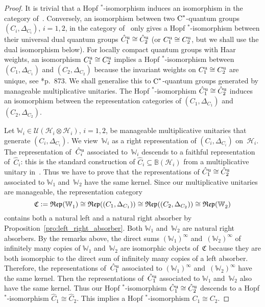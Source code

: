 \documentclass[a4paper]{amsart}
\numberwithin{equation}{section}
\theoremstyle{plain}
\numberwithin{theorem}{section}
\theoremstyle{definition}
\theoremstyle{remark}
\newcommand*{\Cat}{\mathfrak C}     %
\newcommand*{\Corepcat}[1]{\mathfrak{Rep}(#1)}%
\newcommand*{\nb}{\nobreakdash}
\newcommand*{\Star}{$^*$\nb-}
\newcommand*{\Comult}[1][]{\Delta_{#1}}%
\newcommand*{\Bound}{\mathbb B}%
\newcommand*{\univ}{\textup u}%
\newcommand*{\Multunit}[1][]{\mathbb W^{#1}}%
\newcommand*{\Cst}{\textup C^*}%
\newcommand*{\Hils}[1][H]{\mathcal{#1}}%
\newcommand*{\U}{\mathcal U}%
\newcommand*{\defeq}{\mathrel{\vcentcolon=}}
\begin{document}
\begin{proof}
  It is trivial that a Hopf \Star{}isomorphism induces an isomorphism
  in the category of~\cite{Meyer-Roy-Woronowicz:Homomorphisms}.
  Conversely, an isomorphism between two \(\Cst\)\nb-quantum
  groups \((C_i,\Comult[C_i])\),
  \(i=1,2\),
  in the category of~\cite{Meyer-Roy-Woronowicz:Homomorphisms} only
  gives a Hopf \Star{}isomorphism between their universal dual quantum
  groups \(\hat{C}_1^\univ \cong \hat{C}_2^\univ\)
  (or \(C_1^\univ \cong C_2^\univ\),
  but we shall use the dual isomorphism below).  For locally compact
  quantum groups with Haar weights, an isomorphism
  \(C_1^\univ \cong C_2^\univ\)
  implies a Hopf \Star{}isomorphism between \((C_1,\Comult[C_1])\)
  and \((C_2,\Comult[C_2])\)
  because the invariant weights on \(C_1^\univ \cong C_2^\univ\)
  are unique, see \cite{Kustermans-Vaes:LCQG}*{p.~873}.  We shall
  generalise this to \(\Cst\)\nb-quantum
  groups generated by manageable multiplicative unitaries.
  The Hopf \Star{}isomorphism \(\hat{C}_1^\univ \cong
  \hat{C}_2^\univ\) induces an isomorphism between the
  representation categories of \((C_1,\Comult[C_1])\) and
  \((C_2,\Comult[C_2])\).

  Let \(\Multunit_i\in\U(\Hils_i\otimes\Hils_i)\), \(i=1,2\), be
  manageable multiplicative unitaries that generate
  \((C_i,\Comult[C_i])\).  We view~\(\Multunit_i\) as a right
  representation of \((C_i,\Comult[C_i])\) on~\(\Hils_i\).  The
  representation of~\(\hat{C}_i^\univ\) associated
  to~\(\Multunit_i\) descends to a faithful representation
  of~\(\hat{C}_i\): this is the standard construction of
  \(\hat{C}_i\subseteq \Bound(\Hils_i)\) from a multiplicative
  unitary in~\cite{Soltan-Woronowicz:Multiplicative_unitaries}.
  Thus we have to prove that the representations of
  \(\hat{C}_1^\univ \cong \hat{C}_2^\univ\) associated to
  \(\Multunit_1\) and~\(\Multunit_2\) have the same kernel.  Since
  our multiplicative unitaries are manageable, the representation
  category
  \[
  \Cat \defeq \Corepcat{\Multunit_1}
  \cong \Corepcat{(C_1,\Comult[C_1])}
  \cong \Corepcat{(C_2,\Comult[C_2])}
  \cong \Corepcat{\Multunit_2}
  \]
  contains both a natural left and a natural right absorber by
  Proposition~\ref{pro:left_right_absorber}.  Both \(\Multunit_1\)
  and~\(\Multunit_2\) are natural right absorbers.  By the remarks
  above, the direct sums \((\Multunit_1)^\infty\)
  and~\((\Multunit_2)^\infty\) of infinitely many copies of
  \(\Multunit_1\) and~\(\Multunit_2\) are isomorphic objects
  of~\(\Cat\) because they are both isomorphic to the direct sum of
  infinitely many copies of a left absorber.  Therefore, the
  representations of~\(\hat{C}_1^\univ\) associated to
  \((\Multunit_1)^\infty\) and~\((\Multunit_2)^\infty\) have the same
  kernel.  Then the representations of~\(\hat{C}_1^\univ\)
  associated to \(\Multunit_1\) and~\(\Multunit_2\) also have the
  same kernel.  Thus our Hopf \Star{}isomorphism
  \(\hat{C}_1^\univ\cong \hat{C}_2^\univ\) descends to a Hopf
  \Star{}isomorphism \(\hat{C}_1\cong \hat{C}_2\).  This implies a
  Hopf \Star{}isomorphism \(C_1\cong C_2\).
\end{proof}
\end{document}
